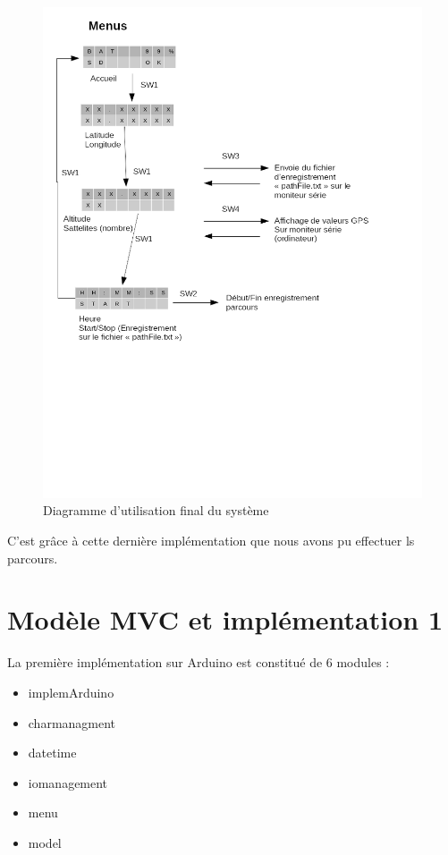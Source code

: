 \documentclass{report}
\begin{document}
\begin{figure}[H]
	\begin{center}
		\includegraphics[scale=0.5]{diagrammeCasUtilisation2.png}
	\end{center}
	\caption{Diagramme d'utilisation final du système}
\end{figure}

C'est grâce à cette dernière implémentation que nous avons pu effectuer
ls parcours.
 

\section{Modèle MVC et implémentation 1}

La première implémentation sur Arduino est constitué de 6 modules :
\begin{itemize}
\item implemArduino
\item charmanagment
\item datetime
\item iomanagement
\item menu
\item model
\end{itemize}
\end{document}

